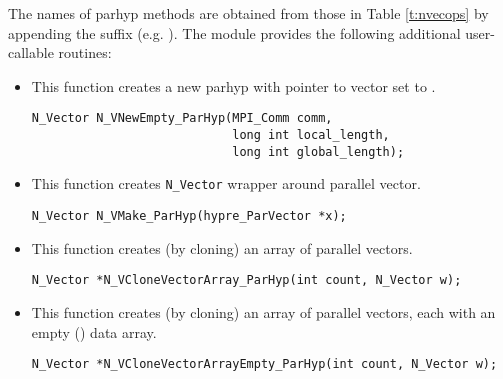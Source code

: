 The names of parhyp methods are obtained from those in Table \ref{t:nvecops}
by appending the suffix  (e.g. ).
The module {\nvecph} provides the following additional user-callable routines:
\begin{itemize}


\item {}
 
  This function creates a new parhyp  with pointer to {\hypre} 
  vector set to .
 
  

\begin{verbatim}
N_Vector N_VNewEmpty_ParHyp(MPI_Comm comm, 
                            long int local_length, 
                            long int global_length);
\end{verbatim}

  

\item {}
  
  This function creates \verb|N_Vector| wrapper around {\hypre} parallel vector.
 
  

\begin{verbatim}
N_Vector N_VMake_ParHyp(hypre_ParVector *x);
\end{verbatim}


\item {}
 
  This function creates (by cloning) an array of  parallel vectors.
 
\begin{verbatim}
N_Vector *N_VCloneVectorArray_ParHyp(int count, N_Vector w);
\end{verbatim}


\item {}
 
  This function creates (by cloning) an array of  parallel vectors,
  each with an empty () data array.
 
\begin{verbatim}
N_Vector *N_VCloneVectorArrayEmpty_ParHyp(int count, N_Vector w);
\end{verbatim}


\end{itemize}
